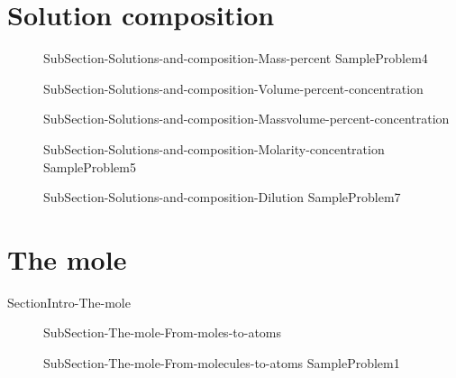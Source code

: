 \documentclass[main.tex]{subfiles}
\newcommand\chapterlabel{ChMIX-statesofmatter}\setcounter{figurenewcounter}{0}\setcounter{tablenewcounter}{0}\setcounter{formulanewcounter}{0}
\begin{document}
 \section{\faTint Solution composition}
\sloppy\begin{description}
\item[]{SubSection-Solutions-and-composition-Mass-percent}
{SampleProblem4}
\item[] {SubSection-Solutions-and-composition-Volume-percent-concentration}
\item[]{SubSection-Solutions-and-composition-Massvolume-percent-concentration}
\item[]{SubSection-Solutions-and-composition-Molarity-concentration}
{SampleProblem5}
\item[]{SubSection-Solutions-and-composition-Dilution}
{SampleProblem7}
 \end{description}

 \renewcommand\chapterlabel{Ch-mole}
    \hspace{0cm}{Figure-The-mole}
\section{\faEnvira The mole}
{SectionIntro-The-mole}
\sloppy \begin{description}
\item[] {SubSection-The-mole-From-moles-to-atoms}
\item[] {SubSection-The-mole-From-molecules-to-atoms}
{SampleProblem1} 
\end{description}
\end{document}
